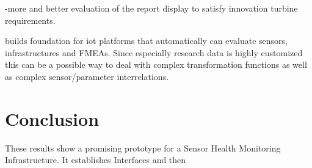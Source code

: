 -more and better evaluation of the report display to satisfy innovation turbine requirements.


builds foundation for iot platforms that automatically can evaluate sensors, infrastructures and FMEAs. Since especially research data is highly customized this can be a possible way to deal with complex transformation functions as well as complex sensor/parameter interrelations.

\section{Conclusion}

These results show a promising prototype for a Sensor Health Monitoring Infrastructure. It establishes Interfaces and then
